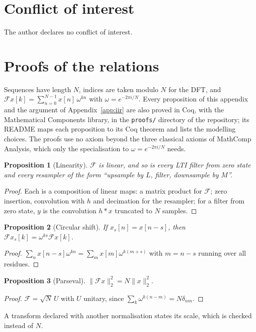 \documentclass[10pt,conference]{IEEEtran}
\newtheorem{proposition}{Proposition}
\newcommand{\DFT}{\mathcal{F}}
\newcommand{\code}[1]{\texttt{#1}}
\begin{document}
\section*{Conflict of interest}
The author declares no conflict of interest.




\appendices

\section{Proofs of the relations}
\label{app:proofs}

Sequences have length $N$, indices are taken modulo $N$ for the DFT, and
$\DFT x[k]=\sum_{n=0}^{N-1}x[n]\,\omega^{kn}$ with $\omega=e^{-2\pi i/N}$.
Every proposition of this appendix and the argument of Appendix~\ref{app:iir}
are also proved in Coq, with the Mathematical Components library, in the
\code{proofs/} directory of the repository; its README maps each proposition to
its Coq theorem and lists the modelling choices. The proofs use no axiom beyond
the three classical axioms of MathComp Analysis, which only the specialisation to
$\omega=e^{-2\pi i/N}$ needs.

\begin{proposition}[Linearity] $\DFT$ is linear, and so is every LTI filter
from zero state and every resampler of the form ``upsample by $L$, filter,
downsample by $M$''.\end{proposition}
\begin{proof} Each is a composition of linear maps: a matrix product for
$\DFT$; zero insertion, convolution with $h$ and decimation for the resampler; for
a filter from zero state, $y$ is the convolution $h*x$ truncated to $N$ samples.
\end{proof}

\begin{proposition}[Circular shift] If $x_s[n]=x[n-s]$, then $\DFT x_s[k]=\omega^{ks}\DFT x[k]$.\end{proposition}
\begin{proof} $\sum_n x[n-s]\omega^{kn}=\sum_m x[m]\omega^{k(m+s)}$ with $m=n-s$
running over all residues.\end{proof}

\begin{proposition}[Parseval] $\|\DFT x\|_2^2=N\|x\|_2^2$.\end{proposition}
\begin{proof} $\DFT=\sqrt N\,U$ with $U$ unitary, since
$\sum_k\omega^{k(n-m)}=N\delta_{nm}$.\end{proof}
A transform declared with another normalisation states its scale, which is
checked instead of $N$.
\end{document}

